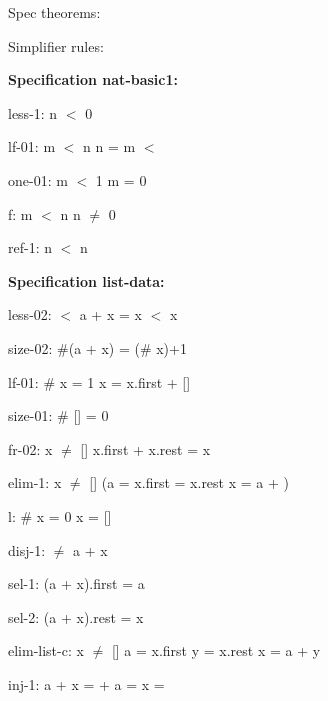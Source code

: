 \documentclass[a4paper]{article}
\begin{document}
\raggedright
              
Spec theorems: 





Simplifier rules: 


{\bf Specification nat-basic1:}

less-1: 
 \Fol \Not n $<$ 0



lf-01: 
 \Fol m $<$ n \And n =  \Imp m $<$ 



one-01: 
 \Fol m $<$ 1 \Equiv m = 0



f: 
 \Fol m $<$ n \Imp n $\neq$ 0



ref-1: 
 \Fol \Not n $<$ n



{\bf Specification list-data:}

less-02: 
 \Fol {} $<$ a + x \Equiv {} = x \Or {} $<$ x



size-02: 
 \Fol \#(a + x) = (\# x)+1



lf-01: 
 \Fol \# x = 1 \Equiv x = x.first + []



size-01: 
 \Fol \# [] = 0



fr-02: 
 \Fol x $\neq$ [] \Imp x.first + x.rest = x



elim-1: 
 \Fol x $\neq$ [] \Imp (a = x.first \And {} = x.rest \Equiv x = a + )



l: 
 \Fol \# x = 0 \Equiv x = []



disj-1: 
 \Fol [] $\neq$ a + x



sel-1: 
 \Fol (a + x).first = a



sel-2: 
 \Fol (a + x).rest = x



elim-list-c: 
x $\neq$ []
 \Fol a = x.first \And y = x.rest \Equiv x = a + y



inj-1: 
 \Fol a + x =  +  \Equiv a =  \And x = 
\end{document}
